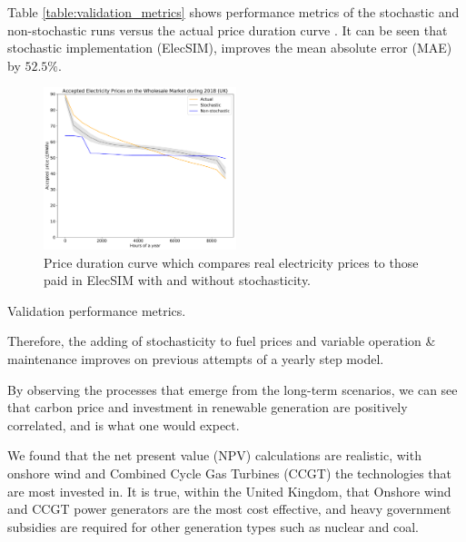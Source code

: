 Table \ref{table:validation_metrics} shows performance metrics of the stochastic and non-stochastic runs versus the actual price duration curve . It can be seen that stochastic implementation (ElecSIM), improves the mean absolute error (MAE) by $52.5\%$.

\begin{figure}
	\begin{center}
		\includegraphics[width=0.5\textwidth]{figures/load_price_duration_curve_comparison.pdf}
		\caption{Price duration curve which compares real electricity prices to those paid in ElecSIM with and without stochasticity.}
		\label{fig:price_duration_curve}
	\end{center}
\end{figure}


\begin{table}
	\centering
	\caption{Validation performance metrics.}
	\label{table:validation_metrics}
\end{table}
\addtolength{\textfloatsep}{-0.05in}

Therefore, the adding of stochasticity to fuel prices and variable operation \& maintenance improves on previous attempts of a yearly step model.

By observing the processes that emerge from the long-term scenarios, we can see that carbon price and investment in renewable generation are positively correlated, and is what one would expect.

We found that the net present value (NPV) calculations are realistic, with onshore wind and Combined Cycle Gas Turbines (CCGT) the technologies that are most invested in. It is true, within the United Kingdom, that Onshore wind and CCGT power generators are the most cost effective, and heavy government subsidies are required for other generation types such as nuclear and coal. 



